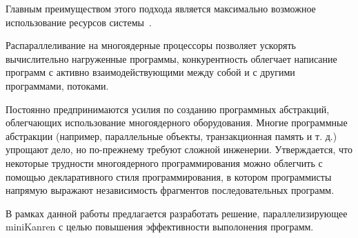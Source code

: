 Главным преимуществом этого подхода является максимально возможное использование ресурсов системы~\cite{concurrency}.

Распараллеливание на многоядерные процессоры позволяет ускорять вычислительно нагруженные программы, 
конкурентность облегчает написание программ с активно взаимодействующими между собой и с другими программами, потоками.

Постоянно предпринимаются усилия по созданию программных
абстракций, облегчающих использование многоядерного оборудования.
Многие программные абстракции (например, параллельные объекты, 
транзакционная память и т. д.) упрощают дело, но по-прежнему 
требуют сложной инженерии. Утверждается, что некоторые трудности 
многоядерного программирования можно облегчить с помощью 
декларативного стиля программирования, в котором 
программисты напрямую выражают независимость фрагментов 
последовательных программ.

В рамках данной работы предлагается разработать решение,
параллелизирующее miniKanren с целью повышения 
эффективности выполонения программ.

